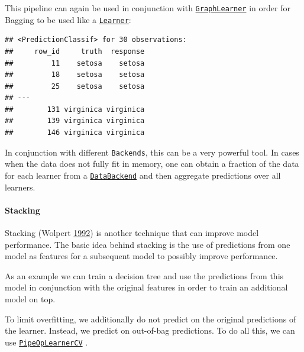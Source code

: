 \documentclass[]{article}
\newenvironment{Shaded}{\begin{snugshade}}{\end{snugshade}}
\newcommand{\KeywordTok}[1]{\textcolor[rgb]{0.13,0.29,0.53}{\textbf{#1}}}
\newcommand{\NormalTok}[1]{#1}
\newcommand{\OperatorTok}[1]{\textcolor[rgb]{0.81,0.36,0.00}{\textbf{#1}}}
\newcommand{\StringTok}[1]{\textcolor[rgb]{0.31,0.60,0.02}{#1}}
\let\oldparagraph\paragraph
\renewcommand{\paragraph}[1]{\oldparagraph{#1}\mbox{}}
\renewenvironment{Shaded} {\begin{snugshade}\small} {\end{snugshade}}
\begin{document}
This pipeline can again be used in conjunction with \href{https://mlr3pipelines.mlr-org.com/reference/mlr_learners_graph.html}{\texttt{GraphLearner}} in order for Bagging to be used like a \href{https://mlr3.mlr-org.com/reference/Learner.html}{\texttt{Learner}}:

\begin{Shaded}
\end{Shaded}

\begin{verbatim}
## <PredictionClassif> for 30 observations:
##     row_id     truth  response
##         11    setosa    setosa
##         18    setosa    setosa
##         25    setosa    setosa
## ---                           
##        131 virginica virginica
##        139 virginica virginica
##        146 virginica virginica
\end{verbatim}

In conjunction with different \texttt{Backends}, this can be a very powerful tool.
In cases when the data does not fully fit in memory, one can obtain a fraction of the data for each learner from a \href{https://mlr3.mlr-org.com/reference/DataBackend.html}{\texttt{DataBackend}} and then aggregate predictions over all learners.

\hypertarget{pipe-model-ensembles-stacking}{%
\paragraph{Stacking}\label{pipe-model-ensembles-stacking}}

Stacking (Wolpert \protect\hyperlink{ref-Wolpert1992}{1992}) is another technique that can improve model performance.
The basic idea behind stacking is the use of predictions from one model as features for a subsequent model to possibly improve performance.

As an example we can train a decision tree and use the predictions from this model in conjunction with the original features in order to train an additional model on top.

To limit overfitting, we additionally do not predict on the original predictions of the learner.
Instead, we predict on out-of-bag predictions.
To do all this, we can use \href{https://mlr3pipelines.mlr-org.com/reference/mlr_pipeops_learner_cv.html}{\texttt{PipeOpLearnerCV}} .
\end{document}
